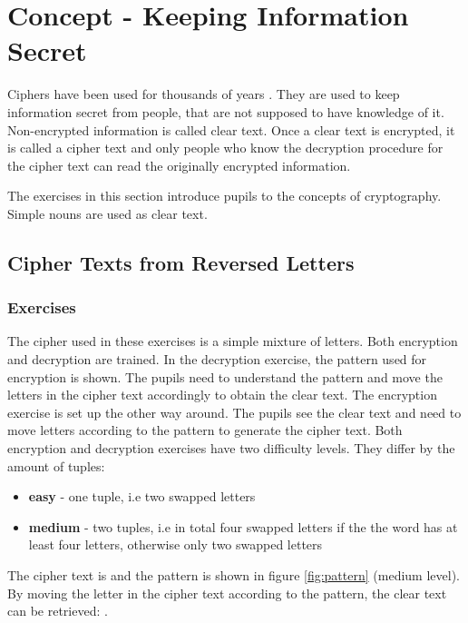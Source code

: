 \chapter{Concept - Keeping Information Secret}
\label{chapter:keepingInformationSecret}

Ciphers have been used for thousands of years \cite{HistoryOfCryptography}. They are used to keep information secret from people, that are not supposed to have knowledge of it. Non-encrypted information is called clear text. Once a clear text is encrypted, it is called a cipher text and only people who know the decryption procedure for the cipher text can read the originally encrypted information.

The exercises in this section introduce pupils to the concepts of cryptography. Simple nouns are used as clear text.

\section{Cipher Texts from Reversed Letters}
\label{section:patterns}

\subsection{Exercises}
The cipher used in these exercises is a simple mixture of letters. Both encryption and decryption are trained. In the decryption exercise, the pattern used for encryption is shown. The pupils need to understand the pattern and move the letters in the cipher text accordingly to obtain the clear text. The encryption exercise is set up the other way around. The pupils see the clear text and need to move letters according to the pattern to generate the cipher text. Both encryption and decryption exercises have two difficulty levels. They differ by the amount of tuples:

\begin{itemize}
    \item \textbf{easy} - one tuple, i.e two swapped letters 
    \item \textbf{medium} - two tuples, i.e in total four swapped letters if the the word has at least four letters, otherwise only two swapped letters 
\end{itemize}

\begin{example}
    The cipher text is  and the pattern is shown in figure \ref{fig:pattern} (medium level). By moving the letter in the cipher text according to the pattern, the clear text can be retrieved: .
\end{example}

